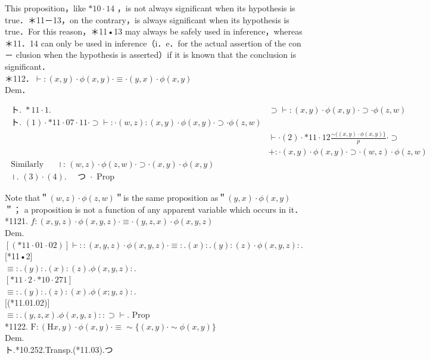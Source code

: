 \documentclass[10pt]{article}
\begin{document}
This proposition，like $* 10 \cdot 14$ ，is not always significant when its hypothesis is true．＊11－13，on the contrary，is always significant when its hypothesis is true．For this reason，＊11•13 may always be safely used in inference，whereas ＊11．14 can only be used in inference（i．e．for the actual assertion of the con－ clusion when the hypothesis is asserted）if it is known that the conclusion is significant．\\
＊112．$\vdash:(x, y) \cdot \phi(x, y) \cdot \equiv \cdot(y, x) \cdot \phi(x, y)$\\
Dem．

\[
\begin{array}{ll}
\text { ト. } * 11 \cdot 1 . & \supset \vdash:(x, y) \cdot \phi(x, y) \cdot \supset \cdot \phi(z, w) \\
\text { ト. }(1) \cdot * 11 \cdot 07 \cdot 11 \cdot \supset \vdash: \cdot(w, z):(x, y) \cdot \phi(x, y) \cdot \supset \cdot \phi(z, w) \\
& \vdash \cdot(2) \cdot * 11 \cdot 12 \frac{\sim((x, y) \cdot \phi(x, y)\}}{p} \cdot \supset \\
& +: \cdot(x, y) \cdot \phi(x, y) \cdot \supset \cdot(w, z) \cdot \phi(z, w) \\
\text { Similarly } \quad \text { ।: }(w, z) \cdot \phi(z, w) \cdot \supset \cdot(x, y) \cdot \phi(x, y)  \tag{4}\\
\text { ।. }(3) \cdot(4) . \quad \text { つ } \cdot \text { Prop }
\end{array}
\]

Note that＂$(w, z) \cdot \phi(z, w)$＂is the same proposition as＂$(y, x) \cdot \phi(x, y)$＂； a proposition is not a function of any apparent variable which occurs in it．\\
*1121. $f:(x, y, z) \cdot \phi(x, y, z) \cdot \equiv \cdot(y, z, x) \cdot \phi(x, y, z)$\\
Dem.\\
$[(* 11 \cdot 01 \cdot 02)] \vdash::(x, y, z) \cdot \phi(x, y, z) \cdot \equiv: .(x): .(y):(z) \cdot \phi(x, y, z):$.\\[0pt]
[*11•2]\\
$\equiv: .(y): .(x):(z) . \phi(x, y, z):$.\\
$[* 11 \cdot 2 \cdot * 10 \cdot 271]$\\
$\equiv: .(y): .(z):(x) . \phi(x ; y, z):$.\\[0pt]
[(*11.01.02)]\\
$\equiv: .(y, z, x) . \phi(x, y, z):: \supset \vdash$. Prop\\
*1122. $\mathrm{F}:(\mathrm{H} x, y) \cdot \phi(x, y) \cdot \equiv \sim\{(x, y) \cdot \sim \phi(x, y)\}$\\
Dem.\\
ト.*10.252.Transp.(*11.03).つ
\end{document}
